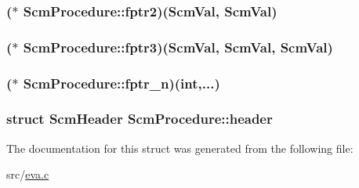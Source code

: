 \hypertarget{struct_scm_procedure_a565e6016515f88f369e8855258c9ef75}{
\subsubsection[{fptr2}]{($\ast$ Scm\-Procedure\-::fptr2)({\bf Scm\-Val}, {\bf Scm\-Val})}}\label{struct_scm_procedure_a565e6016515f88f369e8855258c9ef75}
\hypertarget{struct_scm_procedure_aed3dde4b5c3dd26d9405c8ce514a41e7}{
\subsubsection[{fptr3}]{($\ast$ Scm\-Procedure\-::fptr3)({\bf Scm\-Val}, {\bf Scm\-Val}, {\bf Scm\-Val})}}\label{struct_scm_procedure_aed3dde4b5c3dd26d9405c8ce514a41e7}
\hypertarget{struct_scm_procedure_a3f92e3a96c417b46f78ab5c9af992065}{
\subsubsection[{fptr\-\_\-n}]{($\ast$ Scm\-Procedure\-::fptr\-\_\-n)(int,...)}}\label{struct_scm_procedure_a3f92e3a96c417b46f78ab5c9af992065}
\hypertarget{struct_scm_procedure_a5a8d7e8f7f57fd1418dd19c2dc3133ec}{
\subsubsection[{header}]{\setlength{\rightskip}{0pt plus 5cm}struct {\bf Scm\-Header} Scm\-Procedure\-::header}}\label{struct_scm_procedure_a5a8d7e8f7f57fd1418dd19c2dc3133ec}


The documentation for this struct was generated from the following file\-:\begin{DoxyCompactItemize}
\item 
src/\hyperlink{eva_8c}{eva.\-c}\end{DoxyCompactItemize}
